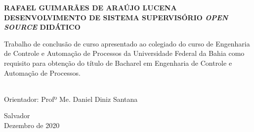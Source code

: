 \begin{center}
	\noindent \uppercase{\textbf{Rafael Guimarães de Araújo Lucena}} \\
	\vspace*{80mm}
	\noindent \uppercase{\large \textbf{Desenvolvimento de sistema supervisório \emph{open source} didático}} \\
\end{center}

\vspace*{20mm}

\begin{flushright}
\begin{minipage}{80mm}
	\noindent Trabalho de conclusão de curso apresentado ao
	colegiado do curso de Engenharia de Controle e
	Automação de Processos da Universidade Federal
	da Bahia como requisito para obtenção do título
	de Bacharel em Engenharia de Controle e
	Automação de Processos.\\\\
\end{minipage}\par
Orientador: Profº Me. Daniel Diniz Santana
\end{flushright}

\vspace*{\fill}

\begin{center}
	Salvador \\
	Dezembro de 2020
\end{center}
